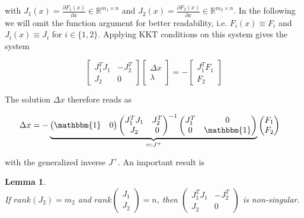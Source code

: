 \documentclass{scrartcl}[12pt, halfparskip]
\numberwithin{equation}{section}
\numberwithin{figure}{section}
\numberwithin{table}{section}
\newtheorem{Lemma}{Lemma}
\begin{document}
with $J_1(x) = \frac{\partial F_1(x)}{\partial x} \in \mathbb{R}^{m_1 \times n}$ and $J_2(x) = \frac{\partial F_2(x)}{\partial x} \in \mathbb{R}^{m_2 \times n}$. In the following we will omit the function argument for better readability, i.e. $F_i(x) \equiv F_i$ and $J_i(x) \equiv J_i$ for $i \in \{1,2\}$.
Applying KKT conditions on this system gives the system

\begin{equation}
	\begin{bmatrix}
		J_1^T J_1 & -J_2^T \\
		J_2 & 0
	\end{bmatrix}
	\begin{bmatrix}
		\Delta x \\
		\lambda
	\end{bmatrix}
	= -
	\begin{bmatrix}
	J_1^T F_1 \\
	F_2
	\end{bmatrix}
	\label{eq:GN_KKT_system}
\end{equation}

The solution $\Delta x$ therefore reads as

\begin{align}
	\Delta x & =
	- \underbrace{\begin{pmatrix}
		\mathbbm{1} & 0
	\end{pmatrix}
	\begin{pmatrix}
		J_1^T J_1 & J_2^T \\
		J_2 & 0
	\end{pmatrix}^{-1}
	\begin{pmatrix}
		J_1^T & 0 \\
		0 & \mathbbm{1}
	\end{pmatrix}}_{=: J^+}
	\begin{pmatrix}
		F_1 \\
		F_2
	\end{pmatrix}
	\label{eq:GN_solution_formal}
\end{align}

with the generalized inverse $J^+$. An important result \cite{diss_bock} is

\begin{Lemma} \textcolor{white}{.}\\
	If $rank(J_2) = m_2$ and $rank 
	\begin{pmatrix}
	J_1 \\
	J_2
	\end{pmatrix}
	= n$,
	then 	
	$\begin{pmatrix}
		J_1^T J_1 & -J_2^T \\
		J_2 & 0
	\end{pmatrix}$
	is non-singular.
\end{Lemma}
\end{document}
